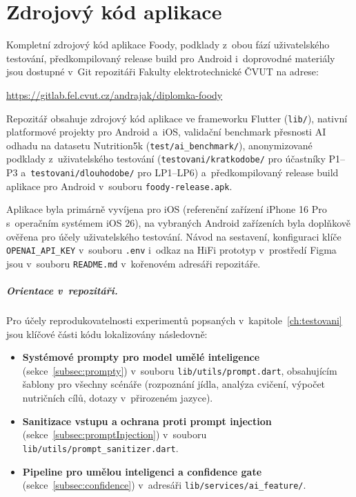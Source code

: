 \chapter{Zdrojový kód aplikace}
\label{app:kod}

Kompletní zdrojový kód aplikace Foody, podklady z~obou fází uživatelského testování, předkompilovaný release build pro Android i~doprovodné materiály jsou dostupné v~Git repozitáři Fakulty elektrotechnické ČVUT na adrese:

\begin{center}
\url{https://gitlab.fel.cvut.cz/andrajak/diplomka-foody}
\end{center}

Repozitář obsahuje zdrojový kód aplikace ve frameworku Flutter (\texttt{lib/}), nativní platformové projekty pro Android a~iOS, validační benchmark přesnosti AI odhadu na datasetu Nutrition5k (\texttt{test/ai\_benchmark/}), anonymizované podklady z~uživatelského testování (\texttt{testovani/kratkodobe/} pro účastníky P1--P3 a~\texttt{testovani/dlouhodobe/} pro LP1--LP6) a~předkompilovaný release build aplikace pro Android v~souboru \texttt{foody-release.apk}.

Aplikace byla primárně vyvíjena pro iOS (referenční zařízení iPhone 16 Pro s~operačním systémem iOS 26), na vybraných Android zařízeních byla doplňkově ověřena pro účely uživatelského testování. Návod na sestavení, konfiguraci klíče \texttt{OPENAI\_API\_KEY} v~souboru \texttt{.env} i~odkaz na HiFi prototyp v~prostředí Figma jsou v~souboru \texttt{README.md} v~kořenovém adresáři repozitáře.

\paragraph{Orientace v~repozitáři.}
Pro účely reprodukovatelnosti experimentů popsaných v~kapitole~\ref{ch:testovani} jsou klíčové části kódu lokalizovány následovně:
\begin{itemize}
	\item \textbf{Systémové prompty pro model umělé inteligence} (sekce~\ref{subsec:prompty}) v~souboru \texttt{lib/utils/prompt.dart}, obsahujícím šablony pro všechny scénáře (rozpoznání jídla, analýza cvičení, výpočet nutričních cílů, dotazy v~přirozeném jazyce).
	\item \textbf{Sanitizace vstupu a ochrana proti prompt injection} (sekce~\ref{subsec:promptInjection}) v~souboru \texttt{lib/utils/prompt\_sanitizer.dart}.
	\item \textbf{Pipeline pro umělou inteligenci a confidence gate} (sekce~\ref{subsec:confidence}) v~adresáři \texttt{lib/services/ai\_feature/}.
\end{itemize}

